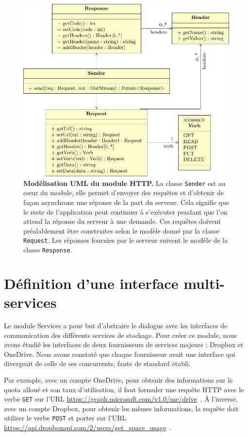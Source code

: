 \begin{figure}[h!]
    \centering
    \includegraphics{figures/http}
    \caption{\textbf{Modélisation UML du module HTTP.} La classe \texttt{Sender} est au cœur du module, elle permet d'envoyer des requêtes et d'obtenir de façon asynchrone une réponse de la part du serveur. Cela signifie que le reste de l'application peut continuer à s'exécuter pendant que l'on attend la réponse du serveur à une demande. Ces requêtes doivent préalablement être construites selon le modèle donné par la classe \texttt{Request}. Les réponses fournies par le serveur suivent le modèle de la classe \texttt{Response}.}
    \label{fig:conception-http}
\end{figure}

\section{Définition d'une interface multi-services}

Le module Services a pour but d'abstraire le dialogue avec les interfaces de communication des différents services de stockage. Pour créer ce module, nous avons étudié les interfaces de deux fournisseurs de services majeurs : Dropbox et OneDrive. Nous avons constaté que chaque fournisseur avait une interface qui divergeait de celle de ses concurrents, faute de standard établi.

Par exemple, avec un compte OneDrive, pour obtenir des informations sur le quota alloué et son taux d'utilisation, il faut formuler une requête HTTP avec le verbe \texttt{GET} sur l'URL \url{https://graph.microsoft.com/v1.0/me/drive}~\parencite{onedrive-api}. À l'inverse, avec un compte Dropbox, pour obtenir les mêmes informations, la requête doit utiliser le verbe \texttt{POST} et porter sur l'URL \url{https://api.dropboxapi.com/2/users/get_space_usage}~\parencite{dropbox-api}.

